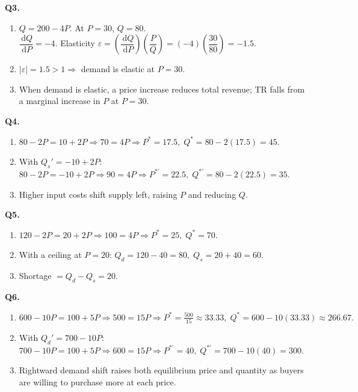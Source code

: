 \documentclass[11pt]{article}
\newcommand{\dd}{\,\mathrm{d}}
\begin{document}
\bigskip

\textbf{Q3.}
\begin{enumerate}[label=(\alph*)]
\item $Q=200-4P.$ At $P=30$, $Q=80.$\\
$\dfrac{\dd Q}{\dd P}=-4.$ Elasticity $\varepsilon = \left(\dfrac{\dd Q}{\dd P}\right)\left(\dfrac{P}{Q}\right)=(-4)\left(\dfrac{30}{80}\right)=-1.5.$
\item $|\varepsilon|=1.5>1 \Rightarrow$ demand is elastic at $P=30.$
\item When demand is elastic, a price increase reduces total revenue; TR falls from a marginal increase in $P$ at $P=30.$
\end{enumerate}

\bigskip

\textbf{Q4.}
\begin{enumerate}[label=(\alph*)]
\item $80-2P=10+2P \Rightarrow 70=4P \Rightarrow P^\ast=17.5,\; Q^\ast=80-2(17.5)=45.$
\item With $Q_s'=-10+2P$: $80-2P=-10+2P \Rightarrow 90=4P \Rightarrow P^{\ast\prime}=22.5,\; Q^{\ast\prime}=80-2(22.5)=35.$
\item Higher input costs shift supply left, raising $P$ and reducing $Q.$
\end{enumerate}

\bigskip

\textbf{Q5.}
\begin{enumerate}[label=(\alph*)]
\item $120-2P=20+2P \Rightarrow 100=4P \Rightarrow P^\ast=25,\; Q^\ast=70.$
\item With a ceiling at $P=20$: $Q_d=120-40=80,\; Q_s=20+40=60.$
\item Shortage $=Q_d-Q_s=20.$
\end{enumerate}

\bigskip

\textbf{Q6.}
\begin{enumerate}[label=(\alph*)]
\item $600-10P=100+5P \Rightarrow 500=15P \Rightarrow P^\ast=\frac{500}{15}\approx 33.33,\; Q^\ast=600-10(33.33)\approx 266.67.$
\item With $Q_d'=700-10P$: $700-10P=100+5P \Rightarrow 600=15P \Rightarrow P^{\ast\prime}=40,\; Q^{\ast\prime}=700-10(40)=300.$
\item Rightward demand shift raises both equilibrium price and quantity as buyers are willing to purchase more at each price.
\end{enumerate}
\end{document}
